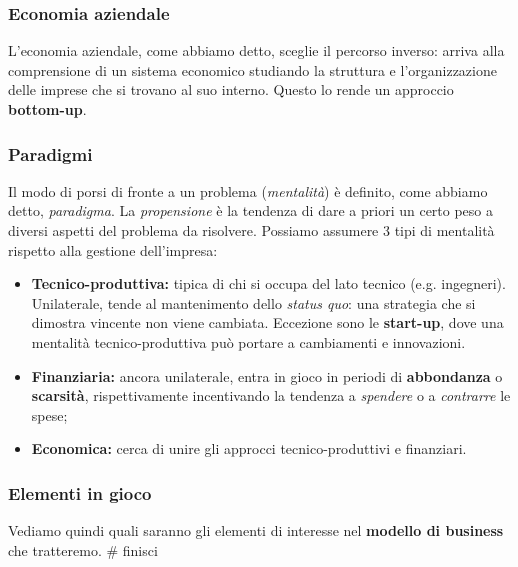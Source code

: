 \documentclass[a4paper,11pt]{article}
\begin{document}
\subsubsection{Economia aziendale}
L'economia aziendale, come abbiamo detto, sceglie il percorso inverso: arriva alla comprensione di un sistema economico studiando la struttura e l'organizzazione delle imprese che si trovano al suo interno.
Questo lo rende un approccio \textbf{bottom-up}.

\subsubsection{Paradigmi}
Il modo di porsi di fronte a un problema (\textit{mentalità}) è definito, come abbiamo detto, \textit{paradigma}.
La \textit{propensione} è la tendenza di dare a priori un certo peso a diversi aspetti del problema da risolvere.
Possiamo assumere 3 tipi di mentalità rispetto alla gestione dell'impresa:
\begin{itemize}
	\item \textbf{Tecnico-produttiva:} tipica di chi si occupa del lato tecnico (e.g. ingegneri). 
		Unilaterale, tende al mantenimento dello \textit{status quo}: una strategia che si dimostra vincente non viene cambiata. Eccezione sono le \textbf{start-up}, dove una mentalità tecnico-produttiva può portare a cambiamenti e innovazioni.
	\item \textbf{Finanziaria:} ancora unilaterale, entra in gioco in periodi di \textbf{abbondanza} o \textbf{scarsità}, rispettivamente incentivando la tendenza a \textit{spendere} o a \textit{contrarre} le spese;
	\item \textbf{Economica:} cerca di unire gli approcci tecnico-produttivi e finanziari.
\end{itemize}

\subsubsection{Elementi in gioco}
Vediamo quindi quali saranno gli elementi di interesse nel \textbf{modello di business} che tratteremo.
# finisci
\end{document}
